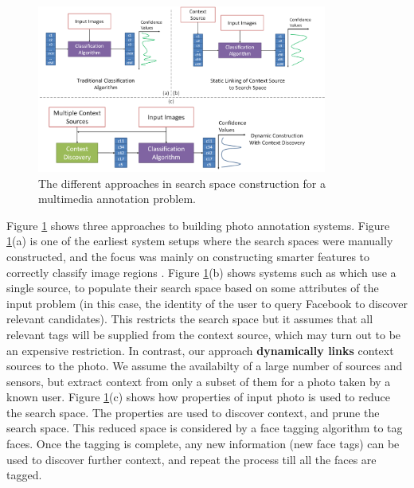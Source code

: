 \begin{figure}[t]
\centering
\includegraphics[width=0.85\textwidth]{media/with-without-cuenet-2.png}
\caption{The different approaches in search space construction for a multimedia annotation problem.}
\label{fig:with-without-cuenet-1}
\end{figure}

Figure \ref{fig:with-without-cuenet-1} shows three approaches to building photo annotation systems. Figure \ref{fig:with-without-cuenet-1}(a) is one of the earliest system setups where the search spaces were manually constructed, and the focus was mainly on constructing smarter features to correctly classify image regions \cite{belhumeur1997eigenfaces, turk1991eigenfaces}. Figure \ref{fig:with-without-cuenet-1}(b) shows systems such as \cite{stone2008autotagging} which use a single source, to populate their search space based on some attributes of the input problem (in this case, the identity of the user to query Facebook to discover relevant candidates). This restricts the search space but it assumes that all relevant tags will be supplied from the context source, which may turn out to be an expensive restriction. In contrast, our approach \textbf{dynamically links} context sources to the photo. We assume the availabilty of a large number of sources and sensors, but extract context from only a subset of them for a photo taken by a known user. Figure \ref{fig:with-without-cuenet-1}(c) shows how properties of input photo is used to reduce the search space. The properties are used to discover context, and prune the search space. This reduced space is considered by a face tagging algorithm to tag faces. Once the tagging is complete, any new information (new face tags) can be used to discover further context, and repeat the process till all the faces are tagged.

